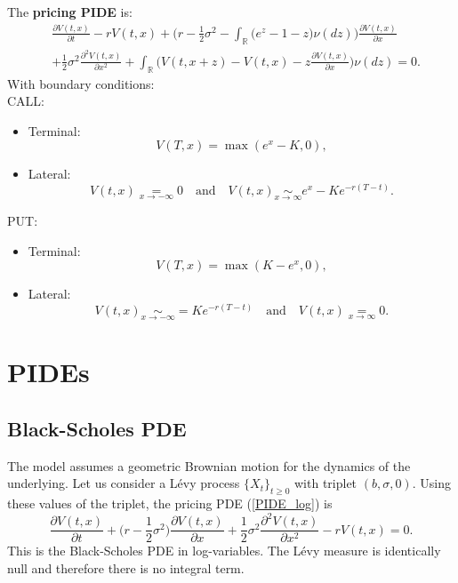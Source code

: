 \documentclass[a4paper,10pt]{article}
\newcommand{\numberset}{\mathbb}
\newcommand{\R}{\numberset{R}}
\begin{document}
\noindent
The \textbf{pricing PIDE} is: 
\begin{align}\label{PIDE_log}
&  \frac{\partial V(t,x)}{\partial t} - r V(t,x) 
          + \biggl( r -\frac{1}{2}\sigma^2 - \int_{\R} \bigl( e^z-1-z \bigr) \nu(dz) \biggr) \frac{\partial V(t,x)}{\partial x} \\ \nonumber
          &+ \frac{1}{2} \sigma^2 \frac{\partial^2 V(t,x)}{\partial x^2} 
          + \int_{\R} \bigl( V(t,x+z)- V(t,x) - z \frac{\partial V(t,x)}{\partial x} \bigr) \nu(dz)  = 0.
\end{align}
With boundary conditions:\\
CALL:
\begin{itemize}
 \item Terminal:
 $$ V(T,x) = \max(e^x-K,0), $$
 \item Lateral:
 $$ V(t, x) \underset{x \to -\infty}{=} 0 \quad \mbox{and} \quad V(t, x) \underset{x \to \infty}{\sim} e^x - Ke^{-r(T-t)}. $$
\end{itemize}
PUT:
\begin{itemize}
 \item Terminal:
 $$ V(T,x) = \max(K-e^x,0), $$
 \item Lateral:
 $$ V(t, x) \underset{x \to -\infty}{\sim} = Ke^{-r(T-t)} \quad \mbox{and} \quad V(t, x) \underset{x \to \infty}{=} 0. $$
\end{itemize}


\section{PIDEs}

\subsection{Black-Scholes PDE}
The \cite{BS73} model assumes a geometric Brownian motion for the dynamics of the underlying.
Let us consider a Lévy process $\{X_t\}_{t\geq 0}$ with triplet $(b,\sigma,0)$.
Using these values of the triplet, the pricing PDE (\ref{PIDE_log}) is
\begin{equation}\label{BS_PDE}
\frac{\partial  V(t,x)}{\partial t}  
          + \biggl( r -\frac{1}{2}\sigma^2 \biggr) \frac{\partial V(t,x)}{\partial x}
          + \frac{1}{2} \sigma^2 \frac{\partial^2  V(t,x)}{\partial x^2} - r  V(t,x)  = 0.
\end{equation}
This is the Black-Scholes PDE in log-variables.
The Lévy measure is identically null and therefore there is no integral term.
\end{document}
